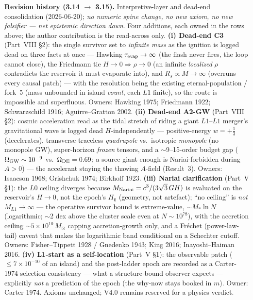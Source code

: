 \documentclass[11pt]{article}
\newcommand{\msun}{M_\odot}
\begin{document}
\medskip
\noindent\textbf{Revision history (3.14 $\to$ 3.15).} Interpretive-layer and dead-end consolidation (2026-06-20); \emph{no numeric spine change, no new axiom, no new falsifier --- net epistemic direction down}. Four additions, each owned in the rows above; the author contribution is the read-across only. \textbf{(i) Dead-end C3} (Part~VIII \S2): the single survivor set to \emph{infinite mass} as the ignition is logged dead on three facts at once --- Hawking $\tau_{\rm evap}\to\infty$ (the flash never fires, the loop cannot close), the Friedmann tie $H\to0\Rightarrow\rho\to0$ (an infinite \emph{localized} $\rho$ contradicts the reservoir it must evaporate into), and $R_s\propto M\to\infty$ (overruns every causal patch) --- with the resolution being the existing eternal-population / fork~5 (mass unbounded in island \emph{count}, each $L1$ finite), so the route is impossible and superfluous. Owners: Hawking 1975; Friedmann 1922; Schwarzschild 1916; Aguirre--Gratton 2002. \textbf{(ii) Dead-end A2-GW} (Part~VIII \S2): cosmic acceleration read as the tidal stretch of riding a giant $L1$--$L1$ merger's gravitational wave is logged dead $H$-independently --- positive-energy $w=+\tfrac13$ (decelerates), transverse-traceless \emph{quadrupole} vs.\ isotropic \emph{monopole} (no monopole GW), super-horizon \emph{frozen} tensors, and a $\sim$9--15-order budget gap ($\Omega_{\rm GW}\sim10^{-9}$ vs.\ $\Omega_{\rm DE}=0.69$; a source giant enough is Nariai-forbidden during $A>0$) --- the accelerant staying the thawing $A$-field (Result~3). Owners: Isaacson 1968; Grishchuk 1974; Birkhoff 1923. \textbf{(iii) Nariai clarification} (Part~V \S1): the $L0$ ceiling diverges because $M_{\rm Nariai}=c^3/(3\sqrt3\,GH)$ is evaluated on the reservoir's $H\to0$, not the epoch's $H_0$ (geometry, not artefact); ``no ceiling'' is \emph{not} $M_{L1}\to\infty$ --- the operative survivor bound is extreme-value, $\sim M_*\ln N$ (logarithmic; $\sim$2 dex above the cluster scale even at $N\sim10^{78}$), with the accretion ceiling $\sim5\times10^{10}\,\msun$ capping accretion-growth only, and a Fr\'echet (power-law-tail) caveat that makes the logarithmic band conditional on a Schechter cutoff. Owners: Fisher--Tippett 1928 / Gnedenko 1943; King 2016; Inayoshi--Haiman 2016. \textbf{(iv) L1-start as a self-location} (Part~V \S1): the observable patch ($\le7\times10^{-10}$ of an island) and the post-ladder epoch are recorded as a Carter-1974 selection consistency --- what a structure-bound observer expects --- explicitly \emph{not} a prediction of the epoch (the why-now stays booked in $m$). Owner: Carter 1974. Axioms unchanged; V4.0 remains reserved for a physics verdict.
\end{document}
